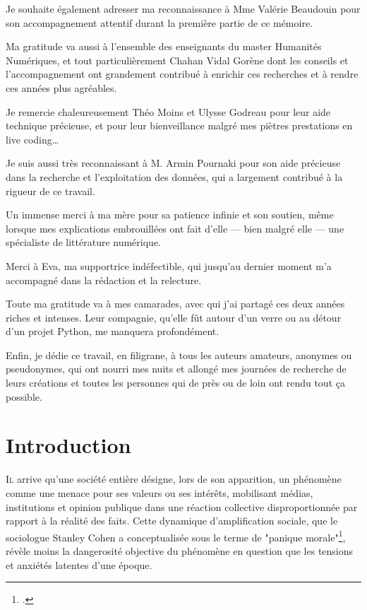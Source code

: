 \documentclass[12pt,a4paper,oneside,titlepage]{book} %
\begin{document}
Je souhaite également adresser ma reconnaissance à Mme Valérie Beaudouin pour son accompagnement attentif durant la première partie de ce mémoire.

Ma gratitude va aussi à l’ensemble des enseignants du master Humanités Numériques, et tout particulièrement Chahan Vidal Gorène dont les conseils et l'accompagnement ont grandement contribué à enrichir ces recherches et à rendre ces années plus agréables.

Je remercie chaleureusement Théo Moins et Ulysse Godreau pour leur aide technique précieuse, et pour leur bienveillance malgré mes piètres prestations en live coding…

Je suis aussi très reconnaissant à M. Armin Pournaki pour son aide précieuse dans la recherche et l’exploitation des données, qui a largement contribué à la rigueur de ce travail.

Un immense merci à ma mère pour sa patience infinie et son soutien, même lorsque mes explications embrouillées ont fait d’elle — bien malgré elle — une spécialiste de littérature numérique.

Merci à Eva, ma supportrice indéfectible, qui jusqu'au dernier moment m'a accompagné dans la rédaction et la relecture.

Toute ma gratitude va à mes camarades, avec qui j’ai partagé ces deux années riches et intenses. Leur compagnie, qu’elle fût autour d’un verre ou au détour d’un projet Python, me manquera profondément.

Enfin, je dédie ce travail, en filigrane, à tous les auteurs amateurs, anonymes ou pseudonymes, qui ont nourri mes nuits et allongé mes journées de recherche de leurs créations et toutes les personnes qui de près ou de loin ont rendu tout ça possible.




\clearpage

\thispagestyle{empty}
\cleardoublepage

\tableofcontents


\newpage
{}

\mainmatter
\chapter*{Introduction}
\lettrine{I}l arrive qu'une société entière désigne, lors de son apparition, un phénomène comme une menace pour ses valeurs ou ses intérêts, mobilisant médias, institutions et opinion publique dans une réaction collective disproportionnée par rapport à la réalité des faits. Cette dynamique d'amplification sociale, que le sociologue Stanley Cohen a conceptualisée sous le terme de "panique morale"\footcite{cohen2011folk}, révèle moins la dangerosité objective du phénomène en question que les tensions et anxiétés latentes d'une époque.
\end{document}
